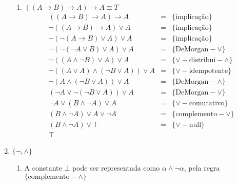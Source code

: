 \begin{enumerate}
\begin{enumerate}
			\item $((A\rightarrow B)\rightarrow A)\rightarrow A\equiv T$
			\[
				\begin{array}{lcl}
					((A \to B) \to A) \to A & = & \{\text{implica\c{c}\~ao}\}\\
					\neg((A \to B) \to A) \lor A & = & \{\text{implica\c{c}\~ao}\}\\
					\neg(\neg(A \to B) \lor A) \lor A & = & \{\text{implica\c{c}\~ao}\}\\
					\neg(\neg(\neg A \lor B)\lor A)\lor A & = & \{\text{DeMorgan}-\lor\}\\
					\neg((A \land \neg B) \lor A) \lor A & = & \{\lor-\text{distribui}-\land\}\\
					\neg((A \lor A) \land (\neg B \lor A)) \lor A & = &\{\lor-\text{idempotente}\}\\
					\neg(A \land (\neg B \lor A)) \lor A & = & \{\text{DeMorgan}-\land\}\\
					(\neg A \lor \neg(\neg B \lor A))\lor A & = & \{\text{DeMorgan}-\lor\} \\
					\neg A \lor (B \land \neg A) \lor A & = &\{\lor-\text{comutativo}\}\\
					(B \land \neg A) \lor A \lor \neg A & = & \{\text{complemento}-\lor\} \\
					(B \land \neg A) \lor \top & = & \{\lor-\text{null}\}\\
					\top
				\end{array}
			\]	
	
	\end{enumerate}
	
	\item $\{\neg,\land\}$
	\begin{enumerate}
		\item A constante $\bot$ pode ser representada como $\alpha\land\neg\alpha$, pela regra $\{\text{complemento}-\land\}$
		

\end{enumerate}
\end{enumerate}
